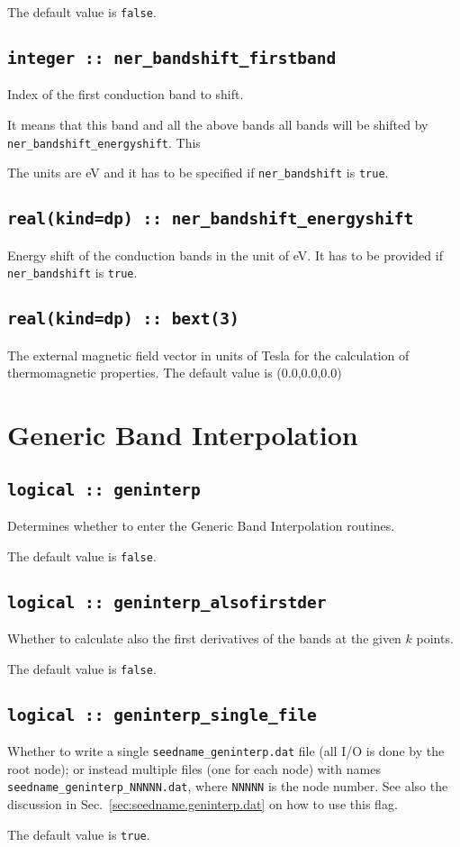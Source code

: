 The default value is \verb#false#.

\subsection[ner\_bandshift\_firstband]{\tt integer :: ner\_bandshift\_firstband}
Index of the first conduction band to shift.

It means that this band and all the above bands all bands will be shifted by  {\tt ner\_bandshift\_energyshift}. This 

The units are eV and it has to be specified if {\tt ner\_bandshift} is \verb#true#. 

\subsection[ner\_bandshift\_energyshift]{\tt real(kind=dp) :: ner\_bandshift\_energyshift}
Energy shift of the conduction bands in the unit of eV. It has to be provided if {\tt ner\_bandshift} is \verb#true#.

\subsection[bext]{\tt real(kind=dp) :: bext(3)}
The external magnetic field vector in units of Tesla for the calculation of thermomagnetic properties. The default value is (0.0,0.0,0.0)

\clearpage
\section{Generic Band Interpolation}
\subsection[boltzwann]{\tt logical :: geninterp}
Determines whether to enter the Generic Band Interpolation routines.

The default value is \verb#false#.

\subsection[geninterp\_alsofirstder]{\tt logical :: geninterp\_alsofirstder}
Whether to calculate also the first derivatives of the bands at the
given $k$ points.

The default value is \verb#false#.

\subsection[geninterp\_alsofirstder]{\tt logical :: geninterp\_single\_file}
Whether to write a single  {\tt seedname\_geninterp.dat} file (all I/O is done by the root node); or
instead multiple files (one for each node) with
names {\tt seedname\_geninterp\_NNNNN.dat}, where {\tt NNNNN} is the
node number.
See also the discussion in Sec.~\ref{sec:seedname.geninterp.dat} on
how to use this flag.

The default value is \verb#true#.
